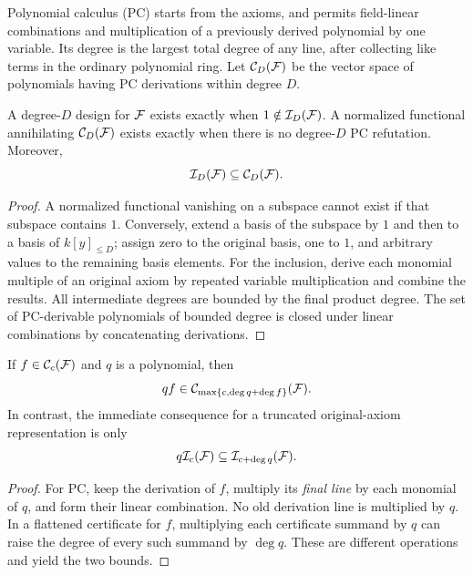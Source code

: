 Polynomial calculus (PC) starts from the axioms, and permits field-linear combinations and multiplication of a previously derived polynomial by one variable. Its degree is the largest total degree of any line, after collecting like terms in the ordinary polynomial ring. Let $\mathcal C_{D}(\mathcal F)$ be the vector space of polynomials having PC derivations within degree $D$.

\begin{lemma}\label{lem:duality}
A degree-$D$ design for $\mathcal F$ exists exactly when $1\notin\mathcal I_{D}(\mathcal F)$. A normalized functional annihilating $\mathcal C_{D}(\mathcal F)$ exists exactly when there is no degree-$D$ PC refutation. Moreover,
\[
 \mathcal I_{D}(\mathcal F)\subseteq\mathcal C_{D}(\mathcal F).
\]
\end{lemma}
\begin{proof}
A normalized functional vanishing on a subspace cannot exist if that subspace contains $1$. Conversely, extend a basis of the subspace by $1$ and then to a basis of $k[y]_{\le D}$; assign zero to the original basis, one to $1$, and arbitrary values to the remaining basis elements. For the inclusion, derive each monomial multiple of an original axiom by repeated variable multiplication and combine the results. All intermediate degrees are bounded by the final product degree. The set of PC-derivable polynomials of bounded degree is closed under linear combinations by concatenating derivations.
\end{proof}

\begin{lemma}\label{lem:reuse}
If $f\in\mathcal C_{c}(\mathcal F)$ and $q$ is a polynomial, then
\[
 qf\in\mathcal C_{\max\{c,\deg q+\deg f\}}(\mathcal F).
\]
In contrast, the immediate consequence for a truncated original-axiom representation is only
\[
 q\mathcal I_{c}(\mathcal F)\subseteq\mathcal I_{c+\deg q}(\mathcal F).
\]
\end{lemma}
\begin{proof}
For PC, keep the derivation of $f$, multiply its \emph{final line} by each monomial of $q$, and form their linear combination. No old derivation line is multiplied by $q$. In a flattened certificate for $f$, multiplying each certificate summand by $q$ can raise the degree of every such summand by $\deg q$. These are different operations and yield the two bounds.
\end{proof}

